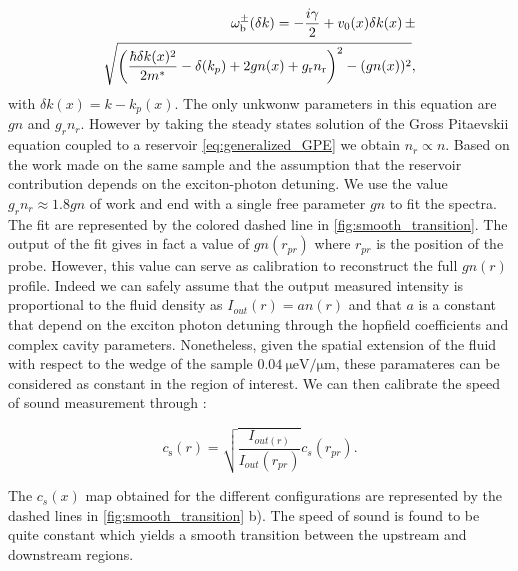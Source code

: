 \begin{equation}
    \label{eq:lfbogo}
    \begin{split}
        \omega_{\mathrm{b}}^{\pm}(\delta k)= -\frac{i\gamma}{2}+ v_0(x) \delta k(x)\,\pm \\\sqrt{\left(\frac{\hbar \delta k(x)^2}{2m^*}-\delta(k_p) +2gn(x) +g_\mathrm{r} n_\mathrm{r}    \right)^2-(gn(x))^2},
    \end{split}
\end{equation}
with $\delta k(x)=k-k_p(x)$. The only unkwonw parameters in this equation are $gn$ and $g_rn_r$. However by taking the steady states solution of the Gross Pitaevskii equation coupled to a reservoir \autoref{eq:generalized_GPE} we obtain $n_r\propto n$.
Based on the work \cite{claude_phd,claude_high-resolution_2022} made on the same sample and the assumption that the reservoir contribution depends on the exciton-photon detuning. We use the value $g_rn_r\approx 1.8gn$ of work \cite{claude_phd} and end 
with a single free parameter $gn$ to fit the spectra. The fit are represented by the colored dashed line in \autoref{fig:smooth_transition}. The output of the fit gives in fact a value of $gn(r_{pr})$ where $r_{pr}$ is the position of the probe. However, this value can serve 
as calibration to reconstruct the full $gn(r)$ profile. Indeed we can safely assume that the output measured intensity is proportional to the 
fluid density as $I_{out}(r)=a n(r)$ and that $a$ is a constant that depend on the exciton photon detuning through the hopfield coefficients and complex 
cavity parameters. Nonetheless, given the spatial extension of the fluid with respect to the wedge of the sample $\SI{0.04}{\micro \electronvolt \per \micro \meter}$, these paramateres can be considered as constant in the region of interest.
We can then calibrate the speed of sound measurement through :

\begin{equation}
    \label{eq:speed_of_sound_calib}
    c_\mathrm{s}(r)=\sqrt{\frac{I_{out(r)}}{I_{out}(r_{pr})}}c_s(r_{pr}).
\end{equation}

The $c_s(x)$ map obtained for the different configurations are represented by the dashed lines in \autoref{fig:smooth_transition} b). The speed of sound is found to be quite constant which yields a smooth transition between the upstream and downstream regions. 

\bigskip

